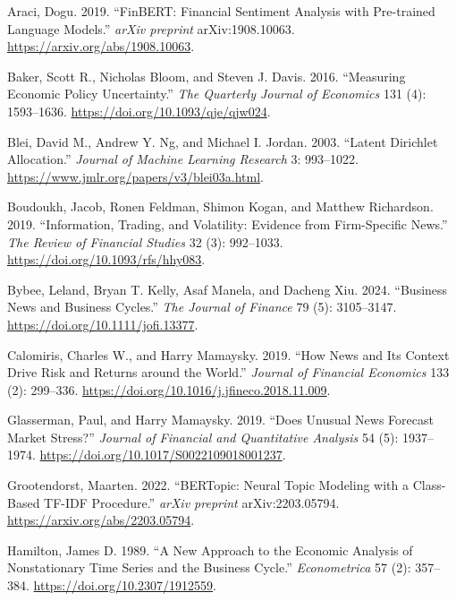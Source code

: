 \documentclass[12pt, letterpaper]{article}
\begin{document}
\begin{description}[leftmargin=1.5em, labelwidth=0pt, itemsep=0.4em]
    \item Araci, Dogu. 2019. ``FinBERT: Financial Sentiment Analysis with Pre-trained Language Models.'' \textit{arXiv preprint} arXiv:1908.10063. \url{https://arxiv.org/abs/1908.10063}.

    \item Baker, Scott R., Nicholas Bloom, and Steven J. Davis. 2016. ``Measuring Economic Policy Uncertainty.'' \textit{The Quarterly Journal of Economics} 131 (4): 1593--1636. \url{https://doi.org/10.1093/qje/qjw024}.

    \item Blei, David M., Andrew Y. Ng, and Michael I. Jordan. 2003. ``Latent Dirichlet Allocation.'' \textit{Journal of Machine Learning Research} 3: 993--1022. \url{https://www.jmlr.org/papers/v3/blei03a.html}.

    \item Boudoukh, Jacob, Ronen Feldman, Shimon Kogan, and Matthew Richardson. 2019. ``Information, Trading, and Volatility: Evidence from Firm-Specific News.'' \textit{The Review of Financial Studies} 32 (3): 992--1033. \url{https://doi.org/10.1093/rfs/hhy083}.

    \item Bybee, Leland, Bryan T. Kelly, Asaf Manela, and Dacheng Xiu. 2024. ``Business News and Business Cycles.'' \textit{The Journal of Finance} 79 (5): 3105--3147. \url{https://doi.org/10.1111/jofi.13377}.

    \item Calomiris, Charles W., and Harry Mamaysky. 2019. ``How News and Its Context Drive Risk and Returns around the World.'' \textit{Journal of Financial Economics} 133 (2): 299--336. \url{https://doi.org/10.1016/j.jfineco.2018.11.009}.

    \item Glasserman, Paul, and Harry Mamaysky. 2019. ``Does Unusual News Forecast Market Stress?'' \textit{Journal of Financial and Quantitative Analysis} 54 (5): 1937--1974. \url{https://doi.org/10.1017/S0022109018001237}.

    \item Grootendorst, Maarten. 2022. ``BERTopic: Neural Topic Modeling with a Class-Based TF-IDF Procedure.'' \textit{arXiv preprint} arXiv:2203.05794. \url{https://arxiv.org/abs/2203.05794}.

    \item Hamilton, James D. 1989. ``A New Approach to the Economic Analysis of Nonstationary Time Series and the Business Cycle.'' \textit{Econometrica} 57 (2): 357--384. \url{https://doi.org/10.2307/1912559}.


\end{description}
\end{document}
